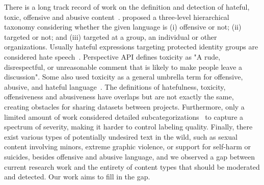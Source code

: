 \documentclass[letterpaper]{article} %
\begin{document}
There is a long track record of work on the definition and detection of hateful, toxic, offensive and abusive content~\cite{kwok2013hate, nobata2016abusive, waseem2016racist, gibert2018hate, vidgen2019challenges, gehman2020realtoxicityprompts, rosenthal2020semisup, lees2022perspective}. \citet{zampieri2019toxic} proposed a three-level hierarchical taxonomy considering whether the given language is (i) offensive or not; (ii) targeted or not; and (iii) targeted at a group, an individual or other organizations. Usually hateful expressions targeting protected identity groups are considered hate speech~\cite{davidson2017automated}. Perspective API defines toxicity as "A rude, disrespectful, or unreasonable comment that is likely to make people leave a discussion". Some also used toxicity as a general umbrella term for offensive, abusive, and hateful language~\cite{pavlopoulos2020toxicity}. The definitions of hatefulness, toxicity, offensiveness and abusiveness have overlaps but are not exactly the same, creating obstacles for sharing datasets between projects. Furthermore, only a limited amount of work considered detailed subcategorizations~\cite{ethos, borkan2019civilcomments} to capture a spectrum of severity, making it harder to control labeling quality. Finally, there exist various types of potentially undesired text in the wild, such as sexual content involving minors, extreme graphic violence, or support for self-harm or suicides, besides offensive and abusive language, and we observed a gap between current research work and the entirety of content types that should be moderated and detected. 
Our work aims to fill in the gap.
\end{document}
